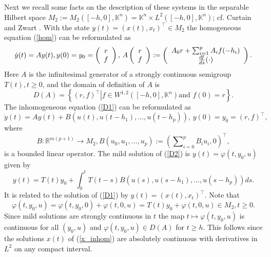 \documentclass{siamltex}%
\begin{document}
Next we recall some facts on the description of these systems in the separable
Hilbert space $M_{2}:=M_{2}([-h,0],\mathbb{K}^{n})=\mathbb{K}^{n}\times
L^{2}([-h,0],\mathbb{K}^{n})$; cf. Curtain and Zwart \cite[Example
5.1.12]{CurtZ}. With the state $y(t)=\left(  x(t),x_{t}\right)  ^{\top}\in
M_{2}$ the homogeneous equation (\ref{hom}) can be reformulated as%
\begin{equation}
\dot{y}(t)=Ay(t),y(0)=y_{0}=\left(
\begin{array}
[c]{c}%
r\\
f
\end{array}
\right)  ,\,A\left(
\begin{array}
[c]{c}%
r\\
f
\end{array}
\right)  :=\left(
\begin{array}
[c]{c}%
A_{0}r+\sum_{i=1}^{p}A_{i}f(-h_{i})\\
\frac{df}{ds}(\cdot)
\end{array}
\right)  . \label{hom_delay}%
\end{equation}
Here $A$ is the infinitesimal generator of a strongly continuous semigroup
$T(t),t\geq0$, and the domain of definition of $A$ is%
\[
D(A)=\left\{  (r,f)^{\top}\left\vert f\in W^{1,2}([-h,0],\mathbb{K}^{n})\text{
and }f(0)=r\right.  \right\}  .
\]
The inhomogeneous equation (\ref{D1}) can be reformulated as%
\begin{equation}
\dot{y}(t)=Ay(t)+B\left(  u(t),u(t-h_{1}),\ldots,u(t-h_{p})\right)
,\,y(0)=y_{0}=\left(  r,f\right)  ^{\top}, \label{D2}%
\end{equation}
where%
\[
B:\mathbb{R}^{m(p+1)}\rightarrow M_{2},B(u_{0},u_{1},\ldots,u_{p}):=\left(
\sum\nolimits_{i=0}^{p}B_{i}u_{i},0\right)  ^{\top},
\]
is a bounded linear operator. The mild solution of (\ref{D2}) is
$y(t)=\varphi(t,y_{0},u)$ given by%
\begin{equation}
y(t)=T(t)y_{0}+\int_{0}^{t}T(t-s)B\left(  u(s),u(s-h_{1}),\ldots
,u(s-h_{p})\right)  ds. \label{mild}%
\end{equation}
It is related to the solution of (\ref{D1}) by $y(t)=\left(  x(t),x_{t}%
\right)  ^{\top}$. Note that%
\begin{equation}
\varphi(t,y_{0},u)=\varphi(t,y_{0},0)+\varphi(t,0,u)=T(t)y_{0}+\varphi
(t,0,u)\in M_{2},t\geq0. \label{phi_aff}%
\end{equation}
Since mild solutions are strongly continuous in $t$ the map $t\mapsto
\varphi(t,y_{0},u)$ is continuous for all $(y_{0},u)$ and $\varphi
(t,y_{0},u)\in D(A)$ for $t\geq h$. This follows since the solutions $x(t)$ of
(\ref{x_inhom}) are absolutely continuous with derivatives in $L^{2}$ on any
compact interval.
\end{document}
